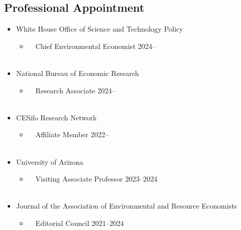 \documentclass[12pt]{res} %
\begin{document}
\begin{resume}
\subsection{Professional Appointment}
	\begin{itemize} \itemsep -12pt
		\item[] White House Office of Science and Technology Policy
		\vspace{-0.05in} 
		\begin{itemize}
			\item[] \,\,\,\, Chief Environmental Economist \hfill 2024--\\\
		\end{itemize}
		\vspace{-0.05in}
		\item[] National Bureau of Economic Research 
		\vspace{-0.05in} 
		\begin{itemize}
			\item[] \,\,\,\, Research Associate \hfill 2024--\\\
		\end{itemize}
		\vspace{-0.05in}
		\item[] CESifo Research Network 
		\vspace{-0.05in} 
		\begin{itemize}
			\item[] \,\,\,\, Affiliate Member \hfill 2022--\\\
		\end{itemize}
		\vspace{-0.05in}
		\item[] University of Arizona
		\vspace{-0.05in} 
		\begin{itemize}
			\item[] \,\,\,\, Visiting Associate Professor \hfill 2023--2024\\\
		\end{itemize}
		\vspace{-0.05in}
		\item[] Journal of the Association of Environmental and Resource Economists 
		\vspace{-0.05in} 
		\begin{itemize}
			\item[] \,\,\,\, Editorial Council \hfill 2021--2024\\\
		\end{itemize}
	\end{itemize}
\vspace{-0.5in}

\end{resume}
\end{document}
